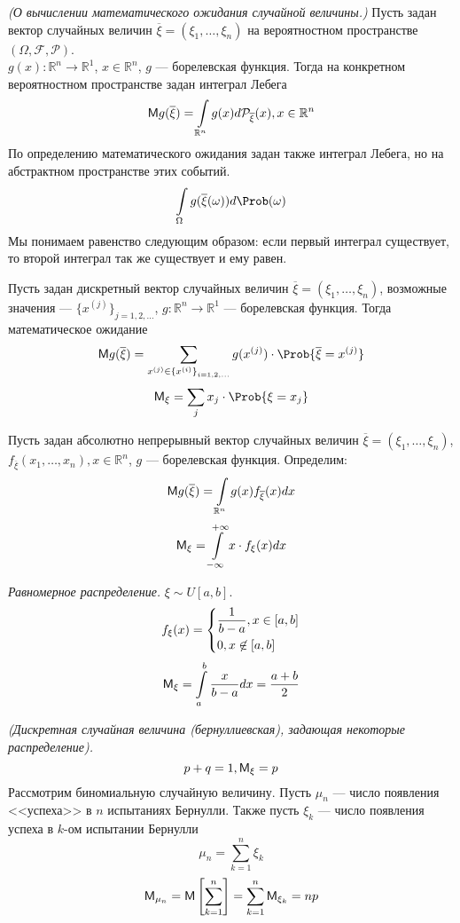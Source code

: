 \begin{theorem} \textit{(О вычислении математического ожидания случайной величины.)} Пусть задан вектор случайных величин $\overline{\xi} = (\xi_1, \ldots, \xi_n)$ на вероятностном пространстве $(\Omega, \mathcal{F}, \mathcal{P})$. \\
$g(x) : \mathbb{R}^n \to \mathbb{R}^1$, $x \in \mathbb{R}^n$, $g$ --- борелевская функция. Тогда на конкретном вероятностном пространстве задан интеграл Лебега
\[
  \mathsf{M} g(\overline\xi) = \int\limits_{\mathbb{R}^n} g(x) d \mathcal{P}_{\overline{\xi}} (x), x \in \mathbb{R}^n
\]
По определению математического ожидания задан также интеграл Лебега, но на абстрактном пространстве этих событий.
\[
  \int\limits_{\Omega} g (\overline{\xi}(\omega)) d \Prob (\omega)
\]
Мы понимаем равенство следующим образом: если первый интеграл существует, то второй интеграл так же существует и ему равен.
\end{theorem}
\begin{conclusion}
  Пусть задан дискретный вектор случайных величин $\overline{\xi} = (\xi_1, \ldots, \xi_n)$, возможные значения --- ${\{ x^{(j)} \}}_{j = 1, 2, \ldots} $,
  $g : \mathbb{R}^n \to \mathbb{R}^1$ --- борелевская функция. Тогда математическое ожидание
  \[
    \MExpect g(\overline{\xi}) = \sum\limits_{x^{(j)} \in {\{ x^{(i)} \}}_{i = 1, 2, \ldots}} g(x^{(j)}) \cdot \Prob \{ \overline{\xi} = x^{(j)} \}
  \]
  \[
    \MExpect_{\xi} = \sum\limits_j x_j \cdot \Prob \{ \xi = x_j \}
  \]
\end{conclusion}
\begin{conclusion}
  Пусть задан абсолютно непрерывный вектор случайных величин $\overline{\xi} = (\xi_1, \ldots, \xi_n)$, $f_{\overline{\xi}}(x_1, \ldots, x_n), x \in \mathbb{R}^n$, $g$ --- борелевская функция. Определим:
  \[
    \mathsf{M} g(\overline{\xi}) = \int\limits_{\mathbb{R}^n} g(x) f_{\overline{\xi}} (x) dx
  \]
  \[
    \mathsf{M}_{\xi} = \int\limits_{-\infty}^{+\infty} x \cdot f_{\xi} (x) dx
  \]
\end{conclusion}
\begin{example} \textit{Равномерное распределение.}
  $\xi \sim U [a, b]$.
  \[
    f_{\xi} (x) = \begin{dcases*}
    \frac{1}{b-a}, x \in [a, b] \\
    0, x \not\in [a, b]
  \end{dcases*}
  \]
  \[
    \mathsf{M}_{\xi} = \int\limits_a^b \frac{x}{b-a} dx = \frac{a+b}{2}
  \]
\end{example}
\begin{example} \textit{(Дискретная случайная величина (бернуллиевская), задающая некоторые распределение).}
  \[
    p + q = 1, \mathsf{M}_{\xi} = p
  \]
  Рассмотрим биномиальную случайную величину. Пусть $\mu_n$ --- число появления <<успеха>> в $n$ испытаниях Бернулли. Также пусть $\xi_k$ --- число появления успеха в $k$-ом испытании Бернулли
  \[
    \mu_n = \sum\limits_{k = 1}^n \xi_k
  \]
  \[
    \mathsf{M}_{\mu_n} = \mathsf{M} \left[ \sum\limits_{k = 1}^n \right] = \sum\limits_{k = 1}^n \mathsf{M}_{\xi_k} = np
  \]
\end{example}
